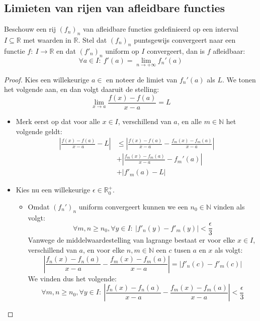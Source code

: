 \documentclass[main.tex]{subfiles}
\begin{document}
\subsection{Limieten van rijen van afleidbare functies}
\label{sec:limieten-van-rijen}

\begin{st}
  Beschouw een rij $(f_{n})_{n}$ van afleidbare functies gedefinieerd op een interval $I \subseteq \mathbb{R}$ met waarden in $\mathbb{R}$.
  Stel dat $(f_{n})_{n}$ puntsgewijs convergeert naar een functie $f:\ I \rightarrow \mathbb{R}$ en dat $(f'_{n})_{n}$ uniform op $I$ convergeert, dan is $f$ afleidbaar:
  \[ \forall a\in I:\ f'(a) = \lim_{n\rightarrow +\infty}f_{n}'(a) \]

  \begin{proof}
    Kies een willekeurige $a\in $ en noteer de limiet van $f_{n}'(a)$ als $L$.
    We tonen het volgende aan, en dan volgt daaruit de stelling:
    \[ \lim_{x\rightarrow a}\frac{f(x)-f(a)}{x-a} = L \]
    \begin{itemize}
    \item Merk eerst op dat voor alle $x\in I$, verschillend van $a$, en alle $m\in \mathbb{N}$ het volgende geldt:
      \[
      \begin{array}{rl}
        \left| \frac{f(x)-f(a)}{x-a} - L \right| 
        &\le \left| \frac{f(x)-f(a)}{x-a} - \frac{f_{m}(x)-f_{m}(a)}{x-a} \right|\\
        &+ \left| \frac{f_{m}(x)-f_{m}(a)}{x-a} - f_{m}'(a) \right|\\
        &+ \left| f'_{m}(a) - L \right|
      \end{array}
      \]
    \item Kies nu een willekeurige $\epsilon \in \mathbb{R}_{0}^{+}$.
      \begin{itemize}
      \item 
        Omdat $(f_{n}')_{n}$ uniform convergeert kunnen we een $n_{0}\in \mathbb{N}$ vinden als volgt:
        \[ \forall m,n \ge n_{0},\forall y\in I:\ |f'_{n}(y)-f'_{m}(y)| < \frac{\epsilon}{3} \]
        Vanwege de middelwaardestelling van lagrange bestaat er voor elke $x\in I$, verschillend van $a$, en voor elke $n,m\in \mathbb{N}$ een $c$ tusen $a$ en $x$ als volgt:
        \[ \left| \frac{f_{n}(x)-f_{n}(a)}{x-a} - \frac{f_{m}(x)-f_{m}(a)}{x-a}\right| = \left| f'_{n}(c) -f'_{m}(c) \right| \]
        We vinden dus het volgende:
        \[ \forall m,n \ge n_{0},\forall y\in I:\ \left| \frac{f_{n}(x)-f_{n}(a)}{x-a} - \frac{f_{m}(x)-f_{m}(a)}{x-a}\right| < \frac{\epsilon}{3} \]

\end{itemize}
\end{itemize}
\end{proof}
\end{st}
\end{document}
